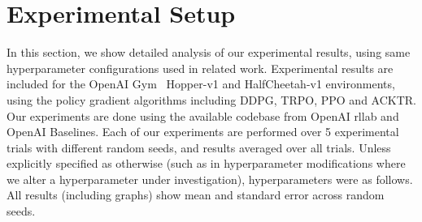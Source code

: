 




\section{Experimental Setup}

In this section, we show detailed analysis of our experimental results, using same hyperparameter configurations used in related work.  Experimental results are included for the OpenAI Gym~\cite{gym} Hopper-v1 and HalfCheetah-v1 environments, using the  policy gradient algorithms including DDPG, TRPO, PPO and ACKTR. Our experiments are done using the available codebase from OpenAI rllab \cite{rllab} and OpenAI Baselines. Each of our experiments are performed over 5 experimental trials with different random seeds, and results averaged over all trials. Unless explicitly specified as otherwise (such as in hyperparameter modifications where we alter a hyperparameter under investigation), hyperparameters were as follows. All results (including graphs) show mean and standard error across random seeds.

